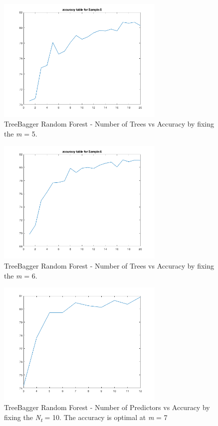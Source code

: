 \documentclass[journal, a4paper]{IEEEtran}
\begin{document}
\begin{figure}[ht!]
\centering
\includegraphics[width=80mm]{images/TBRF_num_predict_5.png}
\caption{TreeBagger Random Forest - Number of Trees vs Accuracy by fixing the \textit{m} = 5.}
\label{tbrfnumpred5}
\end{figure}

\begin{figure}[ht!]
\centering
\includegraphics[width=80mm]{images/TBRF_num_predict_6.png}
\caption{TreeBagger Random Forest - Number of Trees vs Accuracy by fixing the \textit{m} = 6.}
\label{tbrfnumpred6}
\end{figure}

\begin{figure}[ht!]
\centering
\includegraphics[width=80mm]{images/TBRF_numPredict_1_to_12.png}
\caption{TreeBagger Random Forest - Number of Predictors vs Accuracy by fixing the \textit{N\textsubscript{t}} = 10. The accuracy is optimal at \textit{m} = 7}
\label{tbrfnumpred7}
\end{figure}
\end{document}
